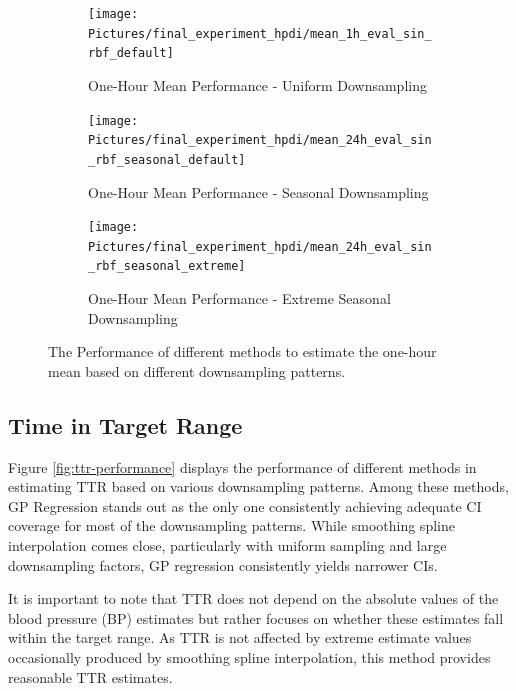 \begin{figure}[!htb]
\centering
\begin{subfigure}{\textwidth}
    \centering
    \texttt{[image: Pictures/final\_experiment\_hpdi/mean\_1h\_eval\_sin\_rbf\_default]}
    \caption{One-Hour Mean Performance - Uniform Downsampling}
    \label{fig:hourly-mean-uniform-sampling-performance}
\end{subfigure}

\bigskip

\begin{subfigure}{\textwidth}
    \centering
    \texttt{[image: Pictures/final\_experiment\_hpdi/mean\_24h\_eval\_sin\_rbf\_seasonal\_default]}
    \caption{One-Hour Mean Performance - Seasonal Downsampling}
    \label{fig:hourly-mean-seasonal-sampling-performance}
\end{subfigure}

\bigskip

\begin{subfigure}{\textwidth}
    \centering
    \texttt{[image: Pictures/final\_experiment\_hpdi/mean\_24h\_eval\_sin\_rbf\_seasonal\_extreme]}
    \caption{One-Hour Mean Performance - Extreme Seasonal Downsampling}
    \label{fig:hourly-mean-extreme-seasonal-sampling-performance}
\end{subfigure}

\caption[One-Hour Mean Performance]{The Performance of different methods to
estimate the one-hour mean based on different downsampling patterns.
}
\label{fig:hourly-mean-performance}
\end{figure}


\subsection{Time in Target Range}\label{subsec:time-in-target-range}

Figure \ref{fig:ttr-performance} displays the performance of different methods
in estimating TTR based on various downsampling patterns.
Among these methods, GP Regression stands out as the only one consistently achieving
adequate CI coverage for most of the downsampling patterns.
While smoothing spline interpolation comes close, particularly with uniform sampling and
large downsampling factors, GP regression consistently yields narrower CIs.

It is important to note that TTR does not depend on the absolute values of the blood pressure (BP)
estimates but rather focuses on whether these estimates fall within the target range.
As TTR is not affected by extreme estimate values occasionally produced by smoothing spline interpolation,
this method provides reasonable TTR estimates.

